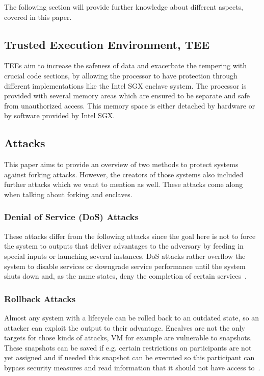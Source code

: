 
The following section will provide further knowledge about different aspects, covered in this paper.

\subsection{Trusted Execution Environment, TEE}

TEEs aim to increase the safeness of data and exacerbate the tempering with crucial code sections, by allowing the processor to have protection through different implementations like the Intel SGX enclave system. The processor is provided with several memory areas which are ensured to be separate and safe from unauthorized access. This memory space is either detached by hardware or by software provided by Intel SGX.

\subsection{Attacks}

This paper aims to provide an overview of two methods to protect systems against forking attacks. However, the creators of those systems also included further attacks which we want to mention as well. These attacks come along when talking about forking and enclaves.

\subsubsection{Denial of Service (DoS) Attacks}
These attacks differ from the following attacks since the goal here is not to force the system to outputs that deliver advantages to the adversary by feeding in special inputs or launching several instances. DoS attacks rather overflow the system to disable services or downgrade service performance until the system shuts down and, as the name states, deny the completion of certain services~\cite{DoS}.

\subsubsection{Rollback Attacks}
Almost any system with a lifecycle can be rolled back to an outdated state, so an attacker can exploit the output to their advantage. Encalves are not the only targets for those kinds of attacks, VM for example are vulnerable to snapshots. These snapshots can be saved if e.g. certain restrictions on participants are not yet assigned and if needed this snapshot can be executed so this participant can bypass security measures and read information that it should not have access to~\cite{Rollback}. 

